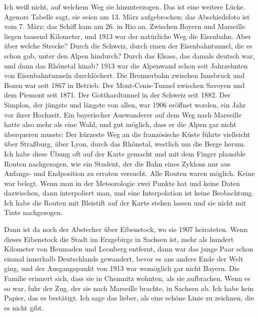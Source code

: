 \documentclass[
  ngerman,
  11pt,
  openany]{book}
\begin{document}
Ich weiß nicht, auf welchem Weg sie hinunterzogen. Das ist eine weitere
Lücke. Agenors Tabelle sagt, sie seien am 13. März aufgebrochen; das
Abschiedsfoto ist vom 7. März; das Schiff kam am 26. in Rio an. Zwischen
Bayern und Marseille liegen tausend Kilometer, und 1913 war der
natürliche Weg die Eisenbahn. Aber über welche Strecke? Durch die
Schweiz, durch einen der Eisenbahntunnel, die es schon gab, unter den
Alpen hindurch? Durch das Elsass, das damals deutsch war, und dann das
Rhônetal hinab? 1913 war die Alpenwand schon seit Jahrzehnten von
Eisenbahntunneln durchlöchert. Die Brennerbahn zwischen Innsbruck und
Bozen war seit 1867 in Betrieb. Der Mont-Cenis-Tunnel zwischen Savoyen
und dem Piemont seit 1871. Der Gotthardtunnel in der Schweiz seit 1882.
Der Simplon, der jüngste und längste von allen, war 1906 eröffnet
worden, ein Jahr vor ihrer Hochzeit. Ein bayerischer Auswanderer auf dem
Weg nach Marseille hatte also mehr als eine Wahl, und gut möglich, dass
er die Alpen gar nicht überqueren musste: Der kürzeste Weg an die
französische Küste führte vielleicht über Straßburg, über Lyon, durch
das Rhônetal, westlich um die Berge herum. Ich habe diese Übung oft auf
der Karte gemacht und mit dem Finger plausible Routen nachgezogen, wie
ein Student, der die Bahn eines Zyklons nur aus Anfangs- und Endposition
zu erraten versucht. Alle Routen waren möglich. Keine war belegt. Wenn
man in der Meteorologie zwei Punkte hat und keine Daten dazwischen, dann
interpoliert man, und eine Interpolation ist keine Beobachtung. Ich habe
die Routen mit Bleistift auf der Karte stehen lassen und sie nicht mit
Tinte nachgezogen.

Dann ist da noch der Abstecher über Eibenstock, wo sie 1907 heirateten.
Wenn dieses Eibenstock die Stadt im Erzgebirge in Sachsen ist, mehr als
hundert Kilometer von Heumaden und Leonberg entfernt, dann war das junge
Paar schon einmal innerhalb Deutschlands gewandert, bevor es ans andere
Ende der Welt ging, und der Ausgangspunkt von 1913 war womöglich gar
nicht Bayern. Die Familie erinnert sich, dass sie in Chemnitz wohnten,
als sie aufbrachen. Wenn es so war, fuhr der Zug, der sie nach Marseille
brachte, in Sachsen ab. Ich habe kein Papier, das es bestätigt. Ich sage
das lieber, als eine schöne Linie zu zeichnen, die es nicht gibt.
\end{document}
